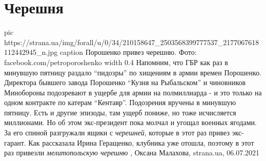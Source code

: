  
 
 
 
 
\chapter{Черешня}
\label{sec:slova.chereshnja}

\ifcmt
  pic https://strana.ua/img/forall/u/0/34/210158647_2503568399777537_2177067618112442945_n.jpg
	caption Порошенко привез черешню. Фото: facebook.com/petroporoshenko
	width 0.4
\fi
Напомним, что ГБР как раз в минувшую пятницу раздало \enquote{пидозры} по хищениям в
армии времен Порошенко.  Директора бывшего завода Порошенко \enquote{Кузня на
Рыбальском} и чиновников Минобороны подозревают в ущербе для армии на
полмиллиарда - и это только на одном контракте по катерам \enquote{Кентавр}. Подозрения
вручены в минувшую пятницу.  Есть и другие эпизоды, там ущерб пониже, но тоже
исчисляется миллионами.  Но об этом экс-президент пока молчал и угощал военных
ягодами. За его спиной разгружали ящики с \emph{черешней}, которые в этот раз привез
экс-гарант.  Как рассказала Ирина Геращенко, клубника уже отошла, поэтому в
этот раз привезли \emph{мелитопольскую черешню}
, 
Оксана Малахова, strana.ua, 06.07.2021

